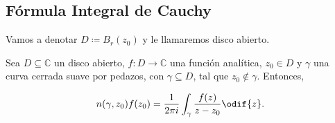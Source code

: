 \documentclass[../main.tex]{subfiles}
\begin{document}
\subsection{Fórmula Integral de Cauchy}

Vamos a denotar \(D \coloneqq  B_{r}(z_{0})\) y le llamaremos disco abierto.

\begin{theorem}
    Sea \(D \subseteq \mathbb{C}\) un disco abierto, \(f \colon D \to \mathbb{C}\) una
    función analítica, \(z_{0}\in  D\) y \(\gamma\) una curva cerrada suave por pedazos,
    con \(\gamma \subseteq D\), tal que \(z_{0}\notin \gamma\). Entonces,

    \begin{equation*}
        n(\gamma, z_{0}) f(z_{0}) = \dfrac{1}{2\pi i}\int_{\gamma}^{}\dfrac{f(z)}{z -
        z_{0}}\odif{z}.
    \end{equation*}
\end{theorem}
\end{document}
